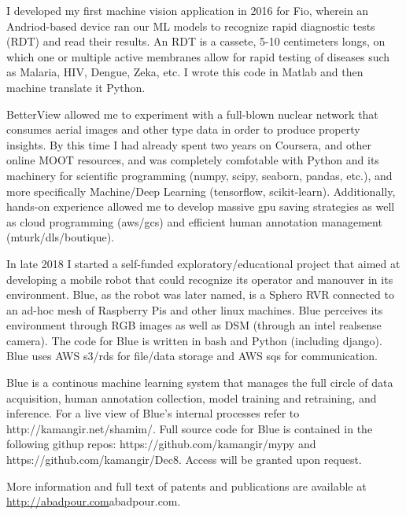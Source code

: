 I developed my first machine vision application in 2016 for Fio, wherein an Andriod-based device ran our ML models to recognize 
rapid diagnostic tests (RDT) and read their results. An RDT is a cassete, 5-10 centimeters longs, on which one or multiple active
membranes allow for rapid testing of diseases such as Malaria, HIV, Dengue, Zeka, etc. I wrote this code in Matlab and then machine 
translate it Python. 

BetterView allowed me to experiment with a full-blown nuclear network that consumes aerial images and other type data in order to 
produce property insights. By this time I had already spent two years on Coursera, and other online MOOT resources, and was completely 
comfotable with Python and its machinery for scientific programming (numpy, scipy, seaborn, pandas, etc.), and more specifically 
Machine/Deep Learning (tensorflow, scikit-learn). Additionally, hands-on experience allowed me to develop massive gpu saving strategies 
as well as cloud programming (aws/gcs) and efficient human annotation management (mturk/dls/boutique).

In late 2018 I started a self-funded exploratory/educational project that aimed at developing a mobile robot that could recognize its
operator and manouver in its environment. Blue, as the robot was later named, is a Sphero RVR connected to an ad-hoc mesh of Raspberry 
Pis and other linux machines. Blue perceives its environment through RGB images as well as DSM (through an intel realsense camera). The 
code for Blue is written in bash and Python (including django). Blue uses AWS s3/rds for file/data storage and AWS sqs for communication. 

Blue is a continous machine learning system that manages the full circle of data acquisition, human annotation collection, model training and
retraining, and inference. For a live view of Blue's internal processes refer to http://kamangir.net/shamim/. Full source code for Blue is 
contained in the following githup repos: https://github.com/kamangir/mypy and https://github.com/kamangir/Dec8. Access will be granted upon 
request. 


\vspace{0.5cm}
More information and full text of patents and publications are available at \url{http://abadpour.com}{abadpour.com}.

\vspace{1.5cm}

